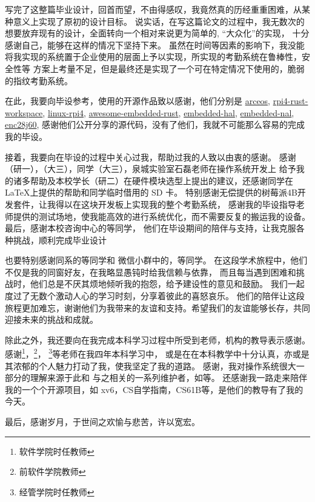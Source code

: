 
写完了这整篇毕业设计，回首而望，不由得感叹，我竟然真的历经重重困难，从某种意义上实现了原初的设计目标。
说实话，在写这篇论文的过程中，我无数次的想要放弃现有的设计，全面转向一个相对来说更为简单的, “大众化”的实现，
十分感谢自己，能够在这样的情况下坚持下来。
虽然在时间等因素的影响下，我没能将我实现的系统置于企业使用的层面上予以实现，所实现的考勤系统在鲁棒性，安全性等
方案上考量不足，但是最终还是实现了一个可在特定情况下使用的，脆弱的指纹考勤系统。

在此，我要向毕设参考，使用的开源作品致以感谢，他们分别是 
\href{https://github.com/rcore-os/arceos.git}{arceos}, 
\href{https://github.com/jonlamb-gh/rpi4-rust-workspace.git}{rpi4-rust-workspace},
\href{https://github.com/raspberrypi/linux.git}{linux-rpi4},
\href{https://github.com/rust-embedded/awesome-embedded-rust.git}{awesome-embedded-rust},
\href{https://github.com/rust-embedded/embedded-hal.git}{embedded-hal},
\href{https://github.com/rust-embedded-community/embedded-nal}{embedded-nal},
\href{https://github.com/japaric/enc28j60.git}{enc28j60},
感谢他们公开分享的源代码，没有了他们，我就不可能那么容易的完成我的毕设。

接着，我要向在毕设的过程中关心过我，帮助过我的人致以由衷的感谢。
感谢（研一），（大三），同学（大三），泉城实验室石磊老师在操作系统开发上
给予我的诸多帮助及本校学长（研二）在硬件模块选型上提出的建议，还感谢同学在 \LaTeX 上提供的帮助和同学临时借用的 SD 卡。
特别感谢无偿提供的树莓派4B开发套件，让我得以在这块开发板上实现我的整个考勤系统，
感谢我的毕设指导老师提供的测试场地，使我能高效的进行系统优化，而不需要反复的搬运我的设备。
最后，感谢本校咨询中心的等同学，
他们在毕设期间的陪伴与支持，让我克服各种挑战，顺利完成毕业设计

也要特别感谢同系的等同学和
微信小群中的，等同学。
在这段学术旅程中，他们不仅是我的同窗好友，在我略显愚钝时给我信赖与依靠，
而且每当遇到困难和挑战时，他们总是不厌其烦地倾听我的抱怨，给予建设性的意见和鼓励。
我们一起度过了无数个激动人心的学习时刻，分享着彼此的喜怒哀乐。
他们的陪伴让这段旅程更加难忘，谢谢他们为我带来的友谊和支持。希望我们的友谊能够长存，共同迎接未来的挑战和成就。

除此之外，我还要向在我完成本科学习过程中所受到老师，机构的教导表示感谢。
感谢\footnote{软件学院时任教师}，\footnote{前软件学院教师}，
\footnote{经管学院时任教师}等老师在我四年本科学习中，
或是在在本科教学中十分认真，亦或是其浓郁的个人魅力打动了我，使我坚定了我的道路。
感谢，我对操作系统很大一部分的理解来源于此和
与之相关的一系列维护者，如等。
还感谢我一路走来陪伴我的一个个开源项目，如 xv6，CS自学指南，CS61B等，是他们的教导有了我的今天。

最后，感谢岁月，于世间之欢愉与悲苦，许以宽宏。

